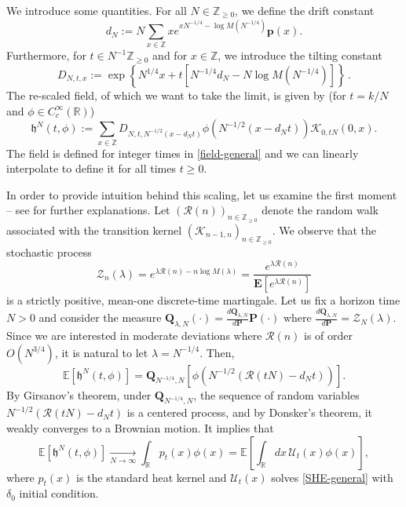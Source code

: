 \documentclass[a4paper,11pt,oneside,reqno]{amsart}
\theoremstyle{definition}
\renewcommand{\geq}{\geqslant}
\numberwithin{equation}{section}
\begin{document}
 We introduce some quantities. For all $N\in \mathbb{Z}_{\geq 0}$, we define the drift constant 
 \begin{equation*}
 	d_{N}:=N\sum_{x\in \mathbb{Z}}xe^{xN^{-1/4}-\log M\left(N^{-1/4}\right)}\mathbf{p}(x).
 \end{equation*}
 Furthermore, for $t\in N^{-1}\mathbb{Z}_{\geq 0}$ and for $x\in \mathbb{Z}$, we introduce the tilting constant
 \begin{equation}\label{tilting-constant}
 	D_{N,t,x}:=\exp{\left\{N^{1/4}x+t\left[N^{-1/4}d_{N}-N\log M(N^{-1/4})\right]\right\}}\,.
 \end{equation}
 The re-scaled field, of which we want to take the limit, is given by (for $t=k/N$ and $\phi\in C_{c}^{\infty}(\mathbb{R})$)
 \begin{equation}\label{field-general}
 	\mathfrak{h}^{N}\left(t,\phi\right):=\sum_{x\in\mathbb{Z}}D_{N,t,N^{-1/2}(x-d_{N}t)}\phi\left(N^{-1/2}\left(x-d_{N}t\right)\right)\mathcal K_{0,tN}(0,x).
 \end{equation}
 The field is defined for integer times in \eqref{field-general} and we can linearly interpolate to define it for all times $t\geqslant 0$. 
 
 In order to provide intuition behind this scaling, let us examine the first moment -- see \cite{parekh2} for further explanations. Let $(\mathcal{R}(n))_{n\in\mathbb{Z}_{\geq 0}}$ denote the random walk associated with the transition kernel $(\mathcal{K}_{n-1,n})_{n\in\mathbb{Z}_{\geq 0}}$. We observe that the stochastic process 
 \begin{equation*}
 	\mathcal Z_n(\lambda) =	e^{\lambda\mathcal{R}(n)-n\log{M(\lambda)}}=\frac{e^{\lambda \mathcal{R}(n)}}{\mathbf{E}[e^{\lambda \mathcal{R}(n)}]}
 \end{equation*}
 is a strictly positive, mean-one discrete-time martingale. Let us fix a horizon time $N>0$ and consider the measure  $\mathbf Q_{\lambda, N}(\cdot ) = \frac{d\mathbf Q_{\lambda, N}}{d\mathbf P} \mathbf{P}(\cdot)$ where $\frac{d\mathbf Q_{\lambda, N}}{d\mathbf P} = \mathcal Z_N(\lambda)$. Since we are interested in moderate deviations where $\mathcal R(n)$ is of order $O(N^{3/4})$, it is natural to let $\lambda=N^{-1/4}$. Then, 
 \begin{equation*}
 	\mathbb{E}\left[\mathfrak{h}^{N}\left(t,\phi\right)\right]=\mathbf Q_{N^{-1/4}, N}\left[\phi\left(N^{-1/2}\left(\mathcal{R}(tN)-d_{N}t\right)\right)\right].
 \end{equation*}
 By Girsanov's theorem, under $\mathbf Q_{N^{-1/4}, N}$, the sequence of random variables $N^{-1/2}\left(\mathcal{R}(tN)-d_{N}t\right)$ is a centered process, and by Donsker's theorem, it weakly converges to a Brownian motion. It implies that
 \begin{equation*}
 	\mathbb{E}\left[\mathfrak{h}^{N}\left(t,\phi\right)\right] \xrightarrow[N\to\infty]{} \int_{\mathbb R} p_t(x) \phi(x)  = \mathbb{E}\left[\int_{\mathbb R} dx\,  \mathcal U_t(x) \phi(x)\right], 
 \end{equation*}
 where $p_t(x)$ is the standard heat kernel and  $\mathcal{U}_{t}(x)$ solves \eqref{SHE-general} with $\delta_{0}$ initial condition. 
\end{document}
